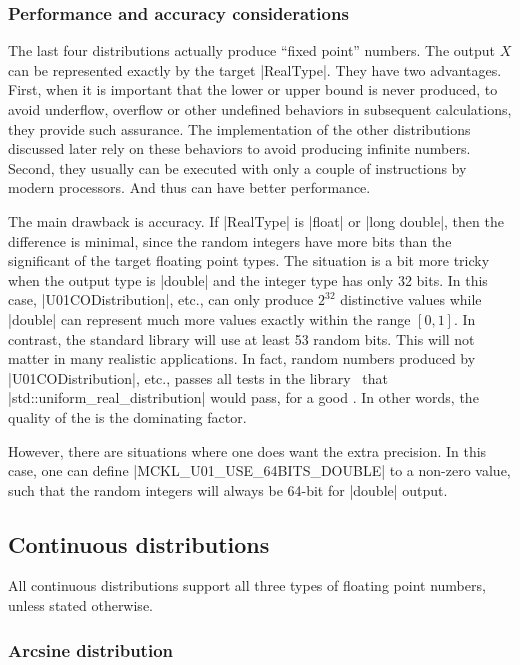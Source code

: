 \subsubsection{Performance and accuracy considerations}

The last four distributions actually produce ``fixed point'' numbers. The
output $X$ can be represented exactly by the target |RealType|. They have two
advantages. First, when it is important that the lower or upper bound is never
produced, to avoid underflow, overflow or other undefined behaviors in
subsequent calculations, they provide such assurance. The implementation of the
other distributions discussed later rely on these behaviors to avoid producing
infinite numbers. Second, they usually can be executed with only a couple of
instructions by modern processors. And thus can have better performance.

The main drawback is accuracy. If |RealType| is |float| or |long double|, then
the difference is minimal, since the random integers have more bits than the
significant of the target floating point types. The situation is a bit more
tricky when the output type is |double| and the integer type has only 32 bits.
In this case, |U01CODistribution|, etc., can only produce $2^{32}$ distinctive
values while |double| can represent much more values exactly within the range
$[0, 1]$. In contrast, the standard library will use at least 53 random bits.
This will not matter in many realistic applications. In fact, random numbers
produced by |U01CODistribution|, etc., passes all tests in the \testu
library~\cite{Lecuyer:2007hv} that |std::uniform_real_distribution| would pass,
for a good \rng. In other words, the quality of the \rng is the dominating
factor.

However, there are situations where one does want the extra precision. In this
case, one can define |MCKL_U01_USE_64BITS_DOUBLE| to a non-zero value, such
that the random integers will always be 64-bit for |double| output.

\subsection{Continuous distributions}
\label{sub:Continuous distributions}

All continuous distributions support all three types of floating point numbers,
unless stated otherwise.

\subsubsection{Arcsine distribution}

